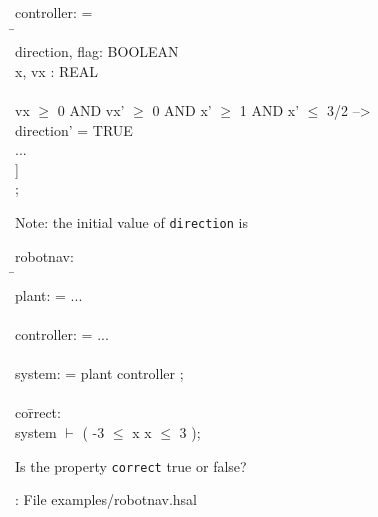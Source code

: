 \documentclass{seminar}
\begin{document}
\begin{slide}

\begin{small}
\begin{tt}
\begin{tabbing}
 controller: {} =
\\ 
 {}\={}
\\ \>
 {} direction, flag: BOOLEAN
\\ \>
 {} x, vx : REAL
\\ \>
 {}
\\ \>
 [ vx \= $\leq$ 0 AND vx' $\leq$ 0 AND x' $\leq$ -1 AND x' $\geq$ -3/2 -->
\\ \> \>
     direction' = FALSE
\\ \>
 [] vx $\geq$ 0 AND vx' $\geq$ 0 AND x' $\geq$ 1 AND x' $\leq$ 3/2 -->
\\ \> \>
     direction' = TRUE  
\\ \>
 [] ...
\\ \>
 ]
\\
 {};
\end{tabbing}
\end{tt}
\end{small}

\bigskip
Note: the initial value of {\tt{direction}} is {}
\end{slide}
\begin{slide}

\begin{small}
\begin{tt}
\begin{tabbing}
robotnav: {}
\\
{}\={}
\\ \>
 plant: {} = ...
\\ 
\\ \>
 controller: {} = ...
\\ 
\\ \>
 system: {} = plant {\crm{||}} controller ;
\\ 
\\ \>
 co\=rrect: {}
\\ \> \>
     system $\vdash$ {}( -3 $\leq$ x {} x $\leq$ 3 );
\\
{}
\end{tabbing}
\end{tt}
\end{small}

\bigskip
Is the property {\tt{correct}} true or false?

\medskip
{}: File examples/robotnav.hsal

\end{slide}
\end{document}
